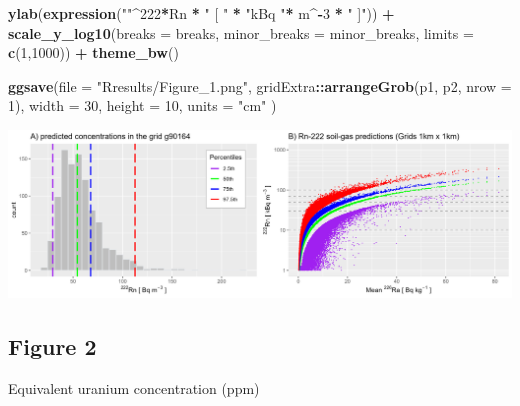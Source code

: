 \documentclass[
  12pt,
]{article}
\newenvironment{Shaded}{\begin{snugshade}}{\end{snugshade}}
\newcommand{\DataTypeTok}[1]{\textcolor[rgb]{0.13,0.29,0.53}{#1}}
\newcommand{\DecValTok}[1]{\textcolor[rgb]{0.00,0.00,0.81}{#1}}
\newcommand{\KeywordTok}[1]{\textcolor[rgb]{0.13,0.29,0.53}{\textbf{#1}}}
\newcommand{\NormalTok}[1]{#1}
\newcommand{\OperatorTok}[1]{\textcolor[rgb]{0.81,0.36,0.00}{\textbf{#1}}}
\newcommand{\StringTok}[1]{\textcolor[rgb]{0.31,0.60,0.02}{#1}}
\begin{document}
\begin{Shaded}
\begin{Highlighting}[]
\StringTok{  }\KeywordTok{ylab}\NormalTok{(}\KeywordTok{expression}\NormalTok{(}\StringTok{""}\OperatorTok{\^{}}\DecValTok{222}\OperatorTok{*}\NormalTok{Rn }\OperatorTok{*}\StringTok{ " [ "} \OperatorTok{*}\StringTok{ "kBq "}\OperatorTok{*}\StringTok{ }\NormalTok{m}\OperatorTok{\^{}{-}}\DecValTok{3} \OperatorTok{*}\StringTok{ " ]"}\NormalTok{)) }\OperatorTok{+}
\StringTok{  }\KeywordTok{scale\_y\_log10}\NormalTok{(}\DataTypeTok{breaks =}\NormalTok{ breaks,}
                \DataTypeTok{minor\_breaks =}\NormalTok{ minor\_breaks,}
                \DataTypeTok{limits =} \KeywordTok{c}\NormalTok{(}\DecValTok{1}\NormalTok{,}\DecValTok{1000}\NormalTok{)) }\OperatorTok{+}
\StringTok{  }\KeywordTok{theme\_bw}\NormalTok{()}

  \KeywordTok{ggsave}\NormalTok{(}\DataTypeTok{file =} \StringTok{"Rresults/Figure\_1.png"}\NormalTok{,}
\NormalTok{         gridExtra}\OperatorTok{::}\KeywordTok{arrangeGrob}\NormalTok{(p1, p2, }\DataTypeTok{nrow =} \DecValTok{1}\NormalTok{),}
       \DataTypeTok{width =} \DecValTok{30}\NormalTok{,}
       \DataTypeTok{height =} \DecValTok{10}\NormalTok{,}
       \DataTypeTok{units =} \StringTok{"cm"}\NormalTok{ )}
\end{Highlighting}
\end{Shaded}

\begin{center}\includegraphics[width=1\linewidth]{Rresults/Figure_1} \end{center}

\hypertarget{figure-2}{%
\subsection{Figure 2}\label{figure-2}}

Equivalent uranium concentration (ppm)
\end{document}
